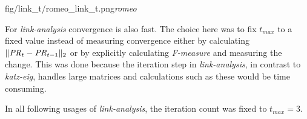 {fig/link_t/romeo_link_t.png}{\textit{romeo}}


For \textit{link-analysis} convergence is also fast. The choice here was to fix $t_{max}$ to a fixed value instead of measuring convergence either by calculating $\| \mathit{PR}_t - \mathit{PR}_{t - 1} \|_2$
or by explicitly calculating \textit{F-measure} and measuring the change. This was done because the iteration step in \textit{link-analysis}, in contrast to \textit{katz-eig}, handles large matrices and calculations such as these would be time consuming.

In all following usages of \textit{link-analysis}, the iteration count was fixed to $t_{max} = 3$.


